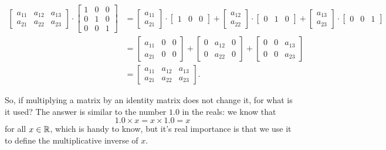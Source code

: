 \begin{align*}
   \begin{bmatrix} a_{11} & a_{12} & a_{13}\\a_{21} & a_{22} & a_{23} \end{bmatrix} \cdot \begin{bmatrix} 1 & 0 & 0\\0& 1 & 0\\ 0 & 0 & 1 \end{bmatrix} &=  \begin{bmatrix} a_{11} \\a_{21}  \end{bmatrix}\cdot \begin{bmatrix} 1 & 0 & 0\end{bmatrix} + 
   \begin{bmatrix} a_{12}\\ a_{22}\end{bmatrix}\cdot \begin{bmatrix}0& 1 & 0 \end{bmatrix} +  
   \begin{bmatrix} a_{13}\\ a_{23}\end{bmatrix}\cdot \begin{bmatrix} 0 & 0 & 1 \end{bmatrix}\\
   &= \begin{bmatrix} a_{11} & 0 & 0\\a_{21} & 0 & 0\end{bmatrix} + \begin{bmatrix} 0 & a_{12} & 0\\0 & a_{22} & 0 \end{bmatrix} +  \begin{bmatrix} 0 & 0 & a_{13}\\0 &  0 & a_{23}  \end{bmatrix}\\
   &=\begin{bmatrix} a_{11} & a_{12} & a_{13}\\a_{21} & a_{22} & a_{23} \end{bmatrix}.
\end{align*}
\Qed


So, if multiplying a matrix by an identity matrix does not change it, for what is it used? The answer is similar to the number $1.0$ in the reals: we know that $$1.0 \times x = x \times 1.0 =x$$ for all $x \in \mathbb R$, which is handy to know, but it's real importance is that we use it to define the multiplicative inverse of $x$. \\

